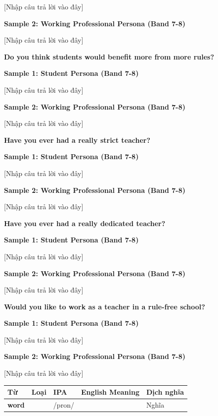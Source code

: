[Nhập câu trả lời vào đây]

\textbf{Sample 2: Working Professional Persona (Band 7-8)}

[Nhập câu trả lời vào đây]

\separator

\begin{ieltsquestion}
\textbf{Do you think students would benefit more from more rules?}
\end{ieltsquestion}
\textbf{Sample 1: Student Persona (Band 7-8)}

[Nhập câu trả lời vào đây]

\textbf{Sample 2: Working Professional Persona (Band 7-8)}

[Nhập câu trả lời vào đây]

\separator

\begin{ieltsquestion}
\textbf{Have you ever had a really strict teacher?}
\end{ieltsquestion}
\textbf{Sample 1: Student Persona (Band 7-8)}

[Nhập câu trả lời vào đây]

\textbf{Sample 2: Working Professional Persona (Band 7-8)}

[Nhập câu trả lời vào đây]

\separator

\begin{ieltsquestion}
\textbf{Have you ever had a really dedicated teacher?}
\end{ieltsquestion}
\textbf{Sample 1: Student Persona (Band 7-8)}

[Nhập câu trả lời vào đây]

\textbf{Sample 2: Working Professional Persona (Band 7-8)}

[Nhập câu trả lời vào đây]

\separator

\begin{ieltsquestion}
\textbf{Would you like to work as a teacher in a rule-free school?}
\end{ieltsquestion}
\textbf{Sample 1: Student Persona (Band 7-8)}

[Nhập câu trả lời vào đây]

\textbf{Sample 2: Working Professional Persona (Band 7-8)}

[Nhập câu trả lời vào đây]

\separator


\vspace{0.8em}
\begin{center}
\renewcommand{\arraystretch}{1.65}
\begin{tabularx}{\textwidth}{|V{0.22\textwidth}|C{0.07\textwidth}|I{0.20\textwidth}|Y|V{0.18\textwidth}|}
\hline
{}
\textbf{Từ} & \textbf{Loại} & \textbf{IPA} & \textbf{English Meaning} & \textbf{Dịch nghĩa} \\
\hline
\textbf{word} &  & /pron/ &  & Nghĩa \\ \hline
\end{tabularx}
\end{center}

\newpage

